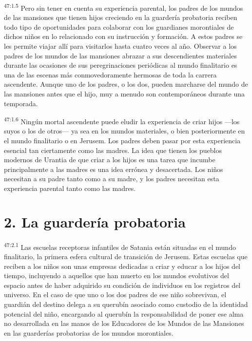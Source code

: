 \par
\textsuperscript{47:1.5} Pero sin tener en cuenta su experiencia parental, los padres de los mundos de las mansiones que tienen hijos creciendo en la guardería probatoria reciben todo tipo de oportunidades para colaborar con los guardianes morontiales de dichos niños en lo relacionado con su instrucción y formación. A estos padres se les permite viajar allí para visitarlos hasta cuatro veces al año. Observar a los padres de los mundos de las mansiones abrazar a sus descendientes materiales durante las ocasiones de sus peregrinaciones periódicas al mundo finalitario es una de las escenas más conmovedoramente hermosas de toda la carrera ascendente. Aunque uno de los padres, o los dos, pueden marcharse del mundo de las mansiones antes que el hijo, muy a menudo son contemporáneos durante una temporada.

\par
\textsuperscript{47:1.6} Ningún mortal ascendente puede eludir la experiencia de criar hijos ---los suyos o los de otros--- ya sea en los mundos materiales, o bien posteriormente en el mundo finalitario o en Jerusem. Los padres deben pasar por esta experiencia esencial tan ciertamente como las madres. La idea que tienen los pueblos modernos de Urantia de que criar a los hijos es una tarea que incumbe principalmente a las madres es una idea errónea y desacertada. Los niños necesitan a su padre tanto como a su madre, y los padres necesitan esta experiencia parental tanto como las madres.

\section*{2. La guardería probatoria}
\par
\textsuperscript{47:2.1} Las escuelas receptoras infantiles de Satania están situadas en el mundo finalitario, la primera esfera cultural de transición de Jerusem. Estas escuelas que reciben a los niños son unas empresas dedicadas a criar y educar a los hijos del tiempo, incluyendo a aquellos que han muerto en los mundos evolutivos del espacio antes de haber adquirido su condición de individuos en los registros del universo. En el caso de que uno o los dos padres de ese niño sobrevivan, el guardián del destino delega a su querubín asociado como custodio de la identidad potencial del niño, encargando al querubín la responsabilidad de poner ese alma no desarrollada en las manos de los Educadores de los Mundos de las Mansiones en las guarderías probatorias de los mundos morontiales.

